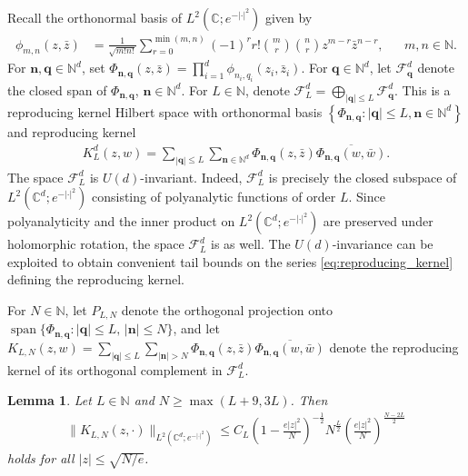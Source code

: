 \documentclass[11pt]{amsart}
\newtheorem{lemma}[theorem]{Lemma}
\DeclareMathOperator{\spanop}{span}
\begin{document}
Recall the orthonormal basis of $L^2(\mathbb C;e^{-|\cdot|^2})$ given by
\begin{align*}
    \phi_{m,n}(z,\bar z)
    &=
    \frac{1}{\sqrt{m!n!}}\sum_{r=0}^{\min(m,n)}
    (-1)^r r!\binom mr\binom nr z^{m-r}\bar z^{n-r}, & &m, n \in \mathbb N.
\end{align*}
For $\mathbf n, \mathbf q \in \mathbb N^d$, set $\Phi_{\mathbf n,\mathbf q}(z,\bar z) = \prod_{i=1}^d \phi_{n_i,q_i}(z_i,\bar z_i)$. For $\mathbf q \in \mathbb N^d$, let $\mathcal F^d_{\mathbf q}$ denote the closed span of $\Phi_{\mathbf n,\mathbf q}$, $\mathbf n \in \mathbb N^d$. For $L \in \mathbb N$, denote $\mathcal F^d_L = \bigoplus_{|\mathbf q| \leq L}{\mathcal F^d_{\mathbf q}}$. This is a reproducing kernel Hilbert space with orthonormal basis $\left\{ \Phi_{\mathbf n, \mathbf q}: |\mathbf q| \leq L, \mathbf n \in \mathbb N^d \right\}$ 
and reproducing kernel
\begin{align}
    \label{eq:reproducing_kernel}
    K_{L}^d(z,w) = \sum_{|\mathbf q| \leq L} \sum_{\mathbf n \in \mathbb N^d} \Phi_{\mathbf n, \mathbf q}(z,\bar z) \overline{\Phi_{\mathbf n, \mathbf q}(w,\bar w)}.
\end{align}
The space $\mathcal F^d_L$ is $U(d)$-invariant. Indeed, $\mathcal F^d_L$ is precisely the closed subspace of $L^2(\mathbb C^d;e^{-|\cdot|^2})$ consisting of polyanalytic functions of order $L$. Since polyanalyticity and the inner product on $L^2(\mathbb C^d;e^{-|\cdot|^2})$ are preserved under holomorphic rotation, the space $\mathcal F^d_L$ is as well. The $U(d)$-invariance can be exploited to obtain convenient tail bounds on the series \eqref{eq:reproducing_kernel} defining the reproducing kernel. 

For $N \in \mathbb N$, let $P_{L,N}$ denote the orthogonal projection onto $\spanop\{\Phi_{\mathbf n,\mathbf q} : |\mathbf q| \leq L,\, |\mathbf n| \leq N\}$, and let $K_{L,N}(z,w) = \sum_{|\mathbf q| \leq L}\sum_{|\mathbf n| > N} \Phi_{\mathbf n,\mathbf q}(z,\bar z)\overline{\Phi_{\mathbf n,\mathbf q}(w,\bar w)}$ denote the reproducing kernel of its orthogonal complement in $\mathcal F^d_L$.

\begin{lemma}
    \label{lem:tail_bound}
    Let $L \in \mathbb N$ and $N\geq \max(L + 9,3 L)$. Then
    \begin{align*}
        \|K_{L,N}(z,\cdot)\|_{L^2(\mathbb C^d;e^{-|\cdot|^2})} \leq C_{L} \left( 1 - \frac{e|z|^2}{N}\right)^{-\frac12}  N^{\frac L2} \left( \frac{e |z|^2}{ N} \right)^{\frac{N-2L}2}
    \end{align*}
    holds for all $|z| \leq \sqrt{N/e}$.
\end{lemma}
\end{document}
